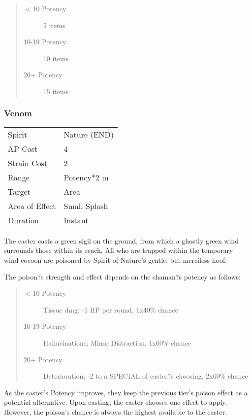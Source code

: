 \documentclass[11pt,a4paper,twocolumn]{book}
\begin{document}
\begin{quote}
	\begin{description}
		\item[$<$10 Potency] 	5 items
		\item[10-19 Potency] 	10 items
		\item[20+ Potency] 		15 items
	\end{description}	
\end{quote}

\subsubsection*{Venom}
{
	\begin{tabu} to 70mm{| X[l,4] | X[l,7] |}
		\hline
		Spirit         & Nature (END) \\
		AP Cost        & 4            \\
		Strain Cost    & 2            \\
		Range          & Potency*2 m  \\
		Target         & Area         \\
		Area of Effect & Small Splash \\
		Duration       & Instant      \\ \hline
	\end{tabu}
}

The caster casts a green sigil on the ground, from which a ghostly green wind surrounds those within its reach. All who are trapped within the temporary wind-cocoon are poisoned by Spirit of Nature's gentle, but merciless hoof.

The poison?s strength and effect depends on the shaman?s potency as follows:
\begin{quote}
	\begin{description}
		\item[$<$10 Potency] 	Tissue dmg; -1 HP per round, 1x40\% chance
		\item[10-19 Potency] 	Hallucinations; Minor Distraction, 1x60\% chance
		\item[20+ Potency] 		Deterioration; -2 to a SPECIAL of caster?s choosing, 2x60\% chance
	\end{description}	
\end{quote}

As the caster's Potency improves, they keep the previous tier's poison effect as a potential alternative. Upon casting, the caster chooses one effect to apply. However, the poison's chance is always the highest available to the caster.
\end{document}

